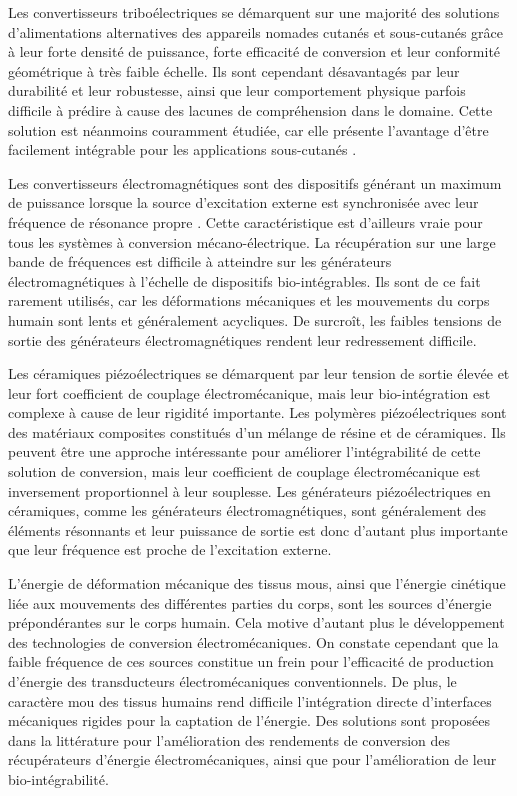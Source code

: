 Les convertisseurs triboélectriques se démarquent sur une majorité des solutions d'alimentations alternatives des appareils nomades cutanés et sous-cutanés grâce à leur forte densité de puissance, forte efficacité de conversion et leur conformité géométrique à très faible échelle. Ils sont cependant désavantagés par leur durabilité et leur robustesse, ainsi que leur comportement physique parfois difficile à prédire à cause des lacunes de compréhension dans le domaine. Cette solution est néanmoins couramment étudiée, car elle présente l'avantage d'être facilement intégrable pour les applications sous-cutanés \cite{Ryu2021}.

Les convertisseurs électromagnétiques sont des dispositifs générant un maximum de puissance lorsque la source d'excitation externe est synchronisée avec leur fréquence de résonance propre \cite{Razek2020}. Cette caractéristique est d'ailleurs vraie pour tous les systèmes à conversion mécano-électrique. La récupération sur une large bande de fréquences est difficile à atteindre sur les générateurs électromagnétiques à l'échelle de dispositifs bio-intégrables. Ils sont de ce fait rarement utilisés, car les déformations mécaniques et les mouvements du corps humain sont lents et généralement acycliques. De surcroît, les faibles tensions de sortie des générateurs électromagnétiques rendent leur redressement difficile.

Les céramiques piézoélectriques se démarquent par leur tension de sortie élevée et leur fort coefficient de couplage électromécanique, mais leur bio-intégration est complexe à cause de leur rigidité importante. Les polymères piézoélectriques sont des matériaux composites constitués d'un mélange de résine et de céramiques. Ils peuvent être une approche intéressante pour améliorer l'intégrabilité de cette solution de conversion, mais leur coefficient de couplage électromécanique est inversement proportionnel à leur souplesse. Les générateurs piézoélectriques en céramiques, comme les générateurs électromagnétiques, sont généralement des éléments résonnants et leur puissance de sortie est donc d'autant plus importante que leur fréquence est proche de l'excitation externe.

L'énergie de déformation mécanique des tissus mous, ainsi que l'énergie cinétique liée aux mouvements des différentes parties du corps, sont les sources d'énergie prépondérantes sur le corps humain. Cela motive d'autant plus le développement des technologies de conversion électromécaniques. On constate cependant que la faible fréquence de ces sources constitue un frein pour l'efficacité de production d'énergie des transducteurs électromécaniques conventionnels. De plus, le caractère mou des tissus humains rend difficile l'intégration directe d'interfaces mécaniques rigides pour la captation de l'énergie. Des solutions sont proposées dans la littérature pour l'amélioration des rendements de conversion des récupérateurs d'énergie électromécaniques, ainsi que pour l'amélioration de leur bio-intégrabilité.
